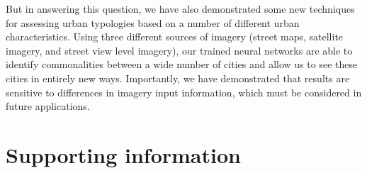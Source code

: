 \documentclass[10pt,letterpaper]{article}
\begin{document}
But in answering this question, we have also demonstrated some new techniques for assessing urban typologies based on a number of different urban characteristics. Using three different sources of imagery (street maps, satellite imagery, and street view level imagery), our trained neural networks are able to identify commonalities between a wide number of cities and allow us to see these cities in entirely new ways. Importantly, we have demonstrated that results are sensitive to differences in imagery input information, which must be considered in future applications. 





\nolinenumbers

%
%
% 
\begin{thebibliography}{}

% 
% 



\end{thebibliography}


\section*{Supporting information}
\end{document}
